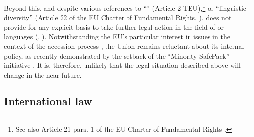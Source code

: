 \documentclass[output=paper,colorlinks,citecolor=brown]{langscibook}
\begin{document}
Beyond this, and despite various references to ``'' (Article 2 TEU),\footnote{%
See also Article 21 para. 1 of the EU Charter of Fundamental Rights \citep{cfr2012}.} or ``linguistic diversity'' (Article 22 of the EU Charter of Fundamental Rights, \citealt{cfr2012}),  does not provide for any explicit basis to take further legal action in the field of  or  languages (\citealt[50]{toggenburg2018}, \citealt{hofmann_malkmus2022b}). Notwithstanding the EU's particular interest in  issues in the context of the accession process \citep[304]{malkmus2023b}, the Union remains reluctant about its internal  policy, as recently demonstrated by the setback of the ``Minority SafePack'' initiative \citep{malkmus2024}. It is, therefore, unlikely that the legal situation described above will change in the near future.

\subsection{International law}\label{CH3.ss.2.3}
\end{document}
